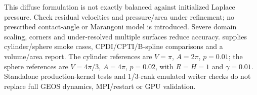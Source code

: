 This diffuse formulation is not exactly balanced against initialized Laplace
pressure. Check residual velocities and pressure/area under refinement; no
prescribed contact-angle or Marangoni model is introduced. Severe domain
scaling, corners and under-resolved multiple surfaces reduce accuracy.
 supplies cylinder/sphere smoke cases,
CPDI/CPTI/B-spline comparisons and a volume/area report. The cylinder references
are $V=\pi$, $A=2\pi$, $p=0.01$; the sphere references are $V=4\pi/3$,
$A=4\pi$, $p=0.02$, with $R=H=1$ and $\gamma=0.01$.
Standalone production-kernel tests and 1/3-rank emulated writer checks do not
replace full GEOS dynamics, MPI/restart or GPU validation.
